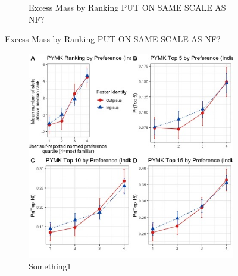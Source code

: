 \documentclass[12pt,letterpaper]{article}
\begin{document}
\begin{figure}[ht]
\begin{subfigure}{.5\textwidth}
        \caption{Excess Mass by Ranking PUT ON SAME SCALE AS NF?}
        \label{fig:pymk_bygroup_em_india}
    \end{subfigure}

\end{figure}

\begin{figure}[ht]
\caption{PYMK Results}
\label{fig:pymk_main_india}
    \begin{subfigure}{.5\textwidth} 
        \centering
        \includegraphics[width=1\linewidth]{Output/Graphs/Audit/Ranking line graphs/India PYMK all outcomes panel by norm preference by ingroup.jpg} 
        \caption{Something1}
        \label{fig:pymk_line_india}
        \end{subfigure}
    \begin{subfigure}{.5\textwidth}
        \centering

\end{subfigure}
\end{figure}
\end{document}
